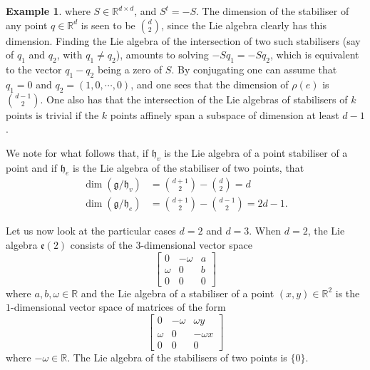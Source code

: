 \documentclass{article}
\theoremstyle{definition}
\newtheorem{example}[theorem]{Example}
\theoremstyle{remark}
\begin{document}
\begin{example}
    where $S\in \mathbb{R}^{d \times d}$, and $S^{t} = - S$. The dimension of the stabiliser of any point $q\in \mathbb{R}^{d}$ is seen to be $\binom{d}{2}$, since the Lie algebra clearly has this dimension. Finding the Lie algebra of the intersection of two such stabilisers (say of $q_1$ and $q_2$, with $q_1 \neq q_2$), amounts to solving $-Sq_1 = -Sq_2$, which is equivalent to the vector $q_1 - q_2$ being a zero of $S$. By conjugating one can assume that $q_1= 0$ and $q_2 = (1, 0, \cdots, 0)$, and one sees that the dimension of $\rho(e)$ is $\binom{d-1}{2}$. One also has that the intersection of the Lie algebras of stabilisers of $k$ points is trivial if the $k$ points affinely span a subspace of dimension at least $d-1$.

    We note for what follows that, if $\mathfrak{h}_v$ is the Lie algebra of a point stabiliser of a point and if $\mathfrak{h}_e$ is the Lie algebra of the stabiliser of two points, that
    \begin{align*}
        \dim(\mathfrak{g}/\mathfrak{h}_v) &= \binom{d+1}{2} - \binom{d}{2} =d\\
        \dim(\mathfrak{g}/\mathfrak{h}_e) &= \binom{d+1}{2} - \binom{d - 1}{2} =2d -1.
    \end{align*}
    
    Let us now look at the particular cases $d=2$ and $d=3$. When $d=2$, the Lie algebra $\mathfrak{e}(2)$ consists of the $3$-dimensional vector space
    \begin{equation*}
    \begin{bmatrix}
     0 & -\omega & a \\
    \omega & 0  & b\\
    0 & 0  & 0
    \end{bmatrix}
    \end{equation*}
    where $a,b,\omega \in \mathbb{R}$ and the Lie algebra of a stabiliser of a point $(x, y) \in \mathbb{R}^{2}$ is the $1$-dimensional vector space of matrices of the form
    \begin{equation*}
    \begin{bmatrix}
     0 &  -\omega &  \omega y \\
    \omega & 0  & -\omega x\\
    0 & 0  & 0
    \end{bmatrix} 
     \end{equation*}
    where $ -\omega \in \mathbb{R}.$ The Lie algebra of the stabilisers of two points is $\{0\}$.


\end{example}
\end{document}
